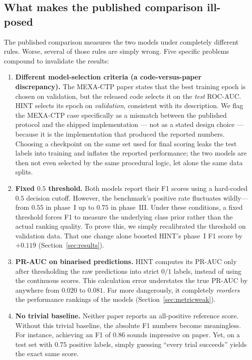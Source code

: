 \documentclass[a4paper,fleqn]{cas-sc}
\begin{document}
\subsection{What makes the published comparison ill-posed}
The published comparison measures the two models under completely different rules. Worse, several of those rules are simply wrong. Five specific problems compound to invalidate the results:
\begin{enumerate}[leftmargin=1.4em,itemsep=1pt,topsep=2pt]
\item \textbf{Different model-selection criteria (a code-versus-paper discrepancy).} The MEXA-CTP paper states that the best training epoch is chosen on validation, but the released code selects it on the \emph{test} ROC-AUC. HINT selects its epoch on \emph{validation}, consistent with its description. We flag the MEXA-CTP case specifically as a mismatch between the published protocol and the shipped implementation --- not as a stated design choice --- because it is the implementation that produced the reported numbers. Choosing a checkpoint on the same set used for final scoring leaks the test labels into training and inflates the reported performance; the two models are then not even selected by the same procedural logic, let alone the same data splits.
\item \textbf{Fixed $0.5$ threshold.} Both models report their F1 scores using a hard-coded $0.5$ decision cutoff. However, the benchmark's positive rate fluctuates wildly---from $0.55$ in phase~I up to $0.75$ in phase~III. Under these conditions, a fixed threshold forces F1 to measure the underlying class prior rather than the actual ranking quality. To prove this, we simply recalibrated the threshold on validation data. That one change alone boosted HINT's phase~I F1 score by $+0.119$ (Section~\ref{sec:results}).
\item \textbf{PR-AUC on binarised predictions.} HINT computes its PR-AUC only after thresholding the raw predictions into strict $0/1$ labels, instead of using the continuous scores. This calculation error understates the true PR-AUC by anywhere from $0.020$ to $0.081$. Far more dangerously, it completely \emph{reorders} the performance rankings of the models (Section~\ref{sec:metricweak}).
\item \textbf{No trivial baseline.} Neither paper reports an all-positive reference score. Without this trivial baseline, the absolute F1 numbers become meaningless. For instance, achieving an F1 of $0.86$ sounds impressive on paper. Yet, on a test set with $0.75$ positive labels, simply guessing ``every trial succeeds'' yields the exact same score.

\end{enumerate}
\end{document}
